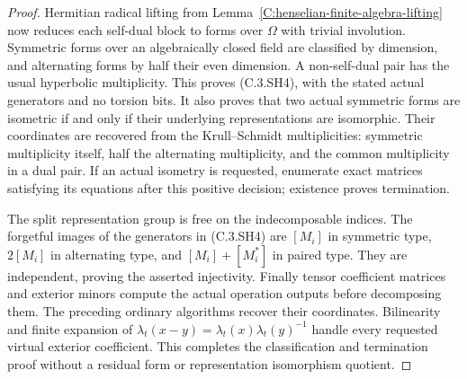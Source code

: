 \begin{proof}
Hermitian radical lifting from
Lemma~\ref{C:henselian-finite-algebra-lifting}
now reduces each self-dual block to forms over
$\Omega$ with trivial involution.
Symmetric forms over an algebraically closed
field are classified by dimension, and alternating
forms by half their even dimension.  A non-self-dual
pair has the usual hyperbolic multiplicity.
This proves (C.3.SH4), with the stated actual
generators and no torsion bits.
It also proves that two actual symmetric forms
are isometric if and only if their underlying
representations are isomorphic.
Their coordinates are recovered from the
Krull--Schmidt multiplicities: symmetric
multiplicity itself, half the alternating
multiplicity, and the common multiplicity in
a dual pair.  If an actual isometry is requested,
enumerate exact matrices satisfying its equations
after this positive decision; existence proves
termination.

The split representation group is free on the
indecomposable indices.  The forgetful images of
the generators in (C.3.SH4) are $[M_i]$ in
symmetric type, $2[M_i]$ in alternating type,
and $[M_i]+[M_i^*]$ in paired type.
They are independent, proving the asserted
injectivity.  Finally tensor coefficient
matrices and exterior minors compute the actual
operation outputs before decomposing them.
The preceding ordinary algorithms recover their
coordinates.  Bilinearity and finite expansion
of $\lambda_t(x-y)=\lambda_t(x)\lambda_t(y)^{-1}$
handle every requested virtual exterior coefficient.
This completes the classification and termination
proof without a residual form or representation
isomorphism quotient.
\end{proof}
